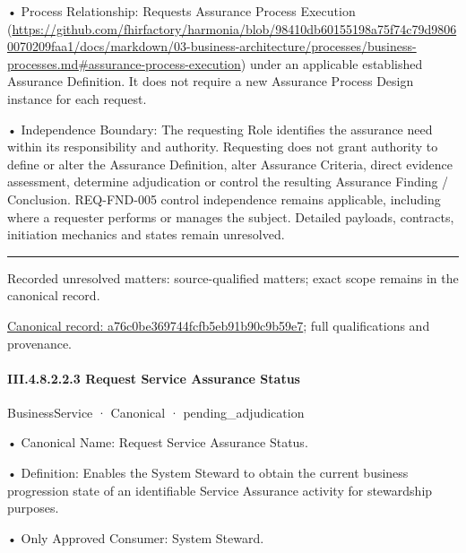 •
Process Relationship: Requests Assurance Process Execution (\url{https://github.com/fhirfactory/harmonia/blob/98410db60155198a75f74c79d98060070209faa1/docs/markdown/03-business-architecture/processes/business-processes.md#assurance-process-execution}) under an applicable established Assurance Definition. It does not require a new Assurance Process Design instance for each request.



•
Independence Boundary: The requesting Role identifies the assurance need within its responsibility and authority. Requesting does not grant authority to define or alter the Assurance Definition, alter Assurance Criteria, direct evidence assessment, determine adjudication or control the resulting Assurance Finding / Conclusion. REQ-FND-005 control independence remains applicable, including where a requester performs or manages the subject. Detailed payloads, contracts, initiation mechanics and states remain unresolved.



\medskip\hrule\medskip

{\small Recorded unresolved matters: source-qualified matters; exact scope remains in the canonical record.}\par
{\footnotesize \href{../../../../../../../../continuum/business/business-service/a76c0be369744fcfb5eb91b90c9b59e7.md}{Canonical record: a76c0be369744fcfb5eb91b90c9b59e7}; full qualifications and provenance.}\par
\paragraph*{III.4.8.2.2.3 Request Service Assurance Status}
\label{navigation:III.4.8.2.2.3}

\label{element:60f8cbc814614f669f31d4e78734c6d6}
{\small BusinessService · Canonical · pending\_adjudication}\par

•
Canonical Name: Request Service Assurance Status.



•
Definition: Enables the System Steward to obtain the current business progression state of an identifiable Service Assurance activity for stewardship purposes.



•
Only Approved Consumer: System Steward.



